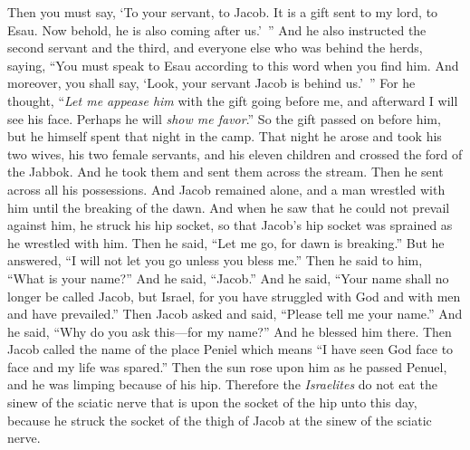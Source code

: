 \begin{biblechapter}
\verse Then you must say, ‘To your servant, to Jacob. It is a gift sent to my lord, to Esau. Now behold, he is also coming after us.’ ”
\verse And he also instructed the second servant and the third, and everyone else who was behind the herds, saying, “You must speak to Esau according to this word when you find him.
\verse And moreover, you shall say, ‘Look, your servant Jacob is behind us.’ ” For he thought, “\textit{Let me appease him} with the gift going before me, and afterward I will see his face. Perhaps he will \textit{show me favor}.”
\verse So the gift passed on before him, but he himself spent that night in the camp.
 That night he arose and took his two wives, his two female servants, and his eleven children and crossed the ford of the Jabbok.
\verse And he took them and sent them across the stream. Then he sent across all his possessions.
\verse And Jacob remained alone, and a man wrestled with him until the breaking of the dawn.
\verse And when he saw that he could not prevail against him, he struck his hip socket, so that Jacob’s hip socket was sprained as he wrestled with him.
\verse Then he said, “Let me go, for dawn is breaking.” But he answered, “I will not let you go unless you bless me.”
\verse Then he said to him, “What is your name?” And he said, “Jacob.”
\verse And he said, “Your name shall no longer be called Jacob, but Israel, for you have struggled with God and with men and have prevailed.”
\verse Then Jacob asked and said, “Please tell me your name.” And he said, “Why do you ask this—for my name?” And he blessed him there.
\verse Then Jacob called the name of the place Peniel which means “I have seen God face to face and my life was spared.”
\verse Then the sun rose upon him as he passed Penuel, and he was limping because of his hip.
\verse Therefore the \textit{Israelites} do not eat the sinew of the sciatic nerve that is upon the socket of the hip unto this day, because he struck the socket of the thigh of Jacob at the sinew of the sciatic nerve.
\end{biblechapter}

